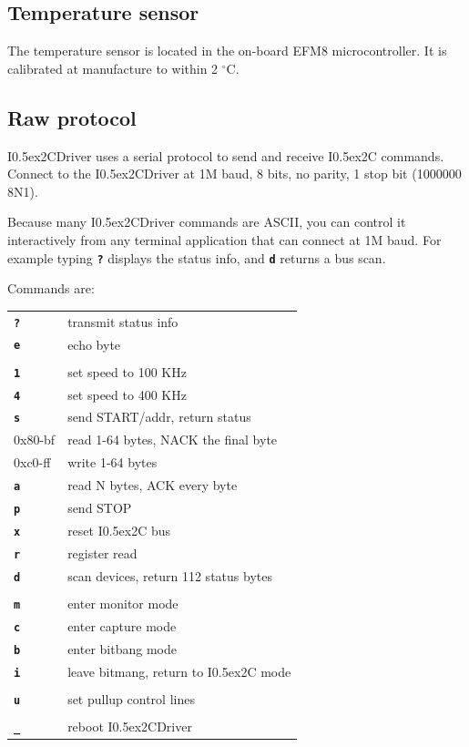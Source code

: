 \documentclass{article}
\newcommand{\two}{\raise0.5ex\hbox{\footnotesize{2}}}
\newcommand{\iic}{I\two{}C}
\newcommand{\iicdriver}{I\two{}CDriver}
\newcommand{\degc}{$^{\circ}$C}
\newcommand{\mach}[1]{\texttt{\textbf{#1}}}
\newcommand{\gap}{\vspace{10pt}}
\begin{document}
\subsection{Temperature sensor}

The temperature sensor is located in the on-board EFM8 microcontroller.
It is calibrated at manufacture to within 2 \degc.

\newpage
\subsection{Raw protocol}

\iicdriver{} uses a serial protocol to send and receive \iic{} commands.
Connect to the \iicdriver{} at 1M baud, 8 bits, no parity, 1 stop bit (1000000 8N1).

Because many \iicdriver{} commands are ASCII, you can control it interactively from any
terminal application that can connect at 1M baud.
For example typing \mach{?} displays the status info,
and \mach{d} returns a bus scan.

Commands are:

\gap\begin{tabular}{ll}
\hline
  \mach{?}        & transmit status info \\
  \mach{e}        & echo byte \\
\\
  \mach{1}        & set speed to 100 KHz\\
  \mach{4}        & set speed to 400 KHz\\
  \mach{s}        & send START/addr, return status\\
  0x80-bf         & read 1-64 bytes, NACK the final byte\\
  0xc0-ff         & write 1-64 bytes\\
  \mach{a}        & read N bytes, ACK every byte\\
  \mach{p}        & send STOP\\
  \mach{x}        & reset \iic{} bus\\
  \mach{r}        & register read\\
  \mach{d}        & scan devices, return 112 status bytes\\
\\
  \mach{m}        & enter monitor mode\\
  \mach{c}        & enter capture mode\\
  \mach{b}        & enter bitbang mode\\
  \mach{i}        & leave bitmang, return to \iic{} mode\\
\\
  \mach{u}        & set pullup control lines\\
\\
  \mach{\_}       & reboot \iicdriver{}\\
\hline
\end{tabular}\gap
\end{document}
